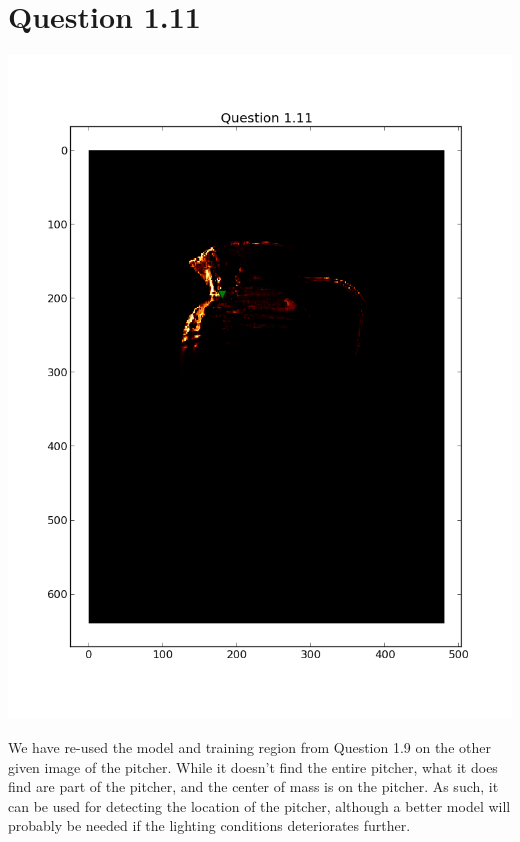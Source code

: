 \documentclass[11pt,a4paper]{article}
\begin{document}
\section{Question 1.11}
\includegraphics[width=1.1\textwidth]{figure_9.png}

We have re-used the model and training region from Question 1.9 on the other given image of the pitcher. While it doesn't find the entire pitcher, what it does find are part of the pitcher, and the center of mass is on the pitcher. As such, it can be used for detecting the location of the pitcher, although a better model will probably be needed if the lighting conditions deteriorates further.
\end{document}
